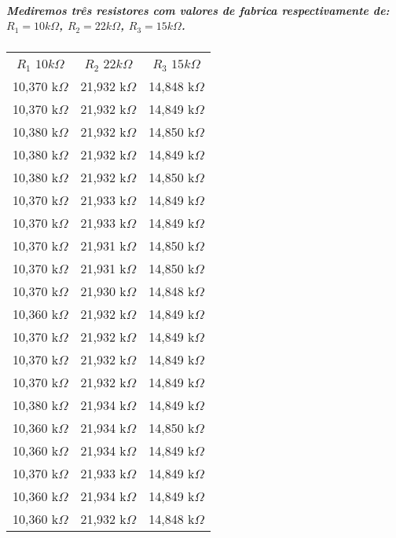 \documentclass[12pt,twoside, a4paper, twocolumn]{article}
\begin{document}
\subparagraph*{Mediremos três resistores com valores de fabrica respectivamente de: $R_1 = 10k\varOmega$, $R_2 = 22k\varOmega$, $R_3 = 15k\varOmega$.}
\begin{center}
    \begin{tabular}{ |c|c|c| }
        \hline
        $R_1$ $10k\varOmega$ & $R_2$ $22k\varOmega$ & $R_3$ $15k\varOmega$ \\
        10,370 k$\varOmega$  & 21,932 k$\varOmega$  & 14,848 k$\varOmega$  \\
        10,370 k$\varOmega$  & 21,932 k$\varOmega$  & 14,849 k$\varOmega$  \\
        10,380 k$\varOmega$  & 21,932 k$\varOmega$  & 14,850 k$\varOmega$  \\
        10,380 k$\varOmega$  & 21,932 k$\varOmega$  & 14,849 k$\varOmega$  \\
        10,380 k$\varOmega$  & 21,932 k$\varOmega$  & 14,850 k$\varOmega$  \\
        10,370 k$\varOmega$  & 21,933 k$\varOmega$  & 14,849 k$\varOmega$  \\
        10,370 k$\varOmega$  & 21,933 k$\varOmega$  & 14,849 k$\varOmega$  \\
        10,370 k$\varOmega$  & 21,931 k$\varOmega$  & 14,850 k$\varOmega$  \\
        10,370 k$\varOmega$  & 21,931 k$\varOmega$  & 14,850 k$\varOmega$  \\
        10,370 k$\varOmega$  & 21,930 k$\varOmega$  & 14,848 k$\varOmega$  \\
        10,360 k$\varOmega$  & 21,932 k$\varOmega$  & 14,849 k$\varOmega$  \\
        10,370 k$\varOmega$  & 21,932 k$\varOmega$  & 14,849 k$\varOmega$  \\
        10,370 k$\varOmega$  & 21,932 k$\varOmega$  & 14,849 k$\varOmega$  \\
        10,370 k$\varOmega$  & 21,932 k$\varOmega$  & 14,849 k$\varOmega$  \\
        10,380 k$\varOmega$  & 21,934 k$\varOmega$  & 14,849 k$\varOmega$  \\
        10,360 k$\varOmega$  & 21,934 k$\varOmega$  & 14,850 k$\varOmega$  \\
        10,360 k$\varOmega$  & 21,934 k$\varOmega$  & 14,849 k$\varOmega$  \\
        10,370 k$\varOmega$  & 21,933 k$\varOmega$  & 14,849 k$\varOmega$  \\
        10,360 k$\varOmega$  & 21,934 k$\varOmega$  & 14,849 k$\varOmega$  \\
        10,360 k$\varOmega$  & 21,932 k$\varOmega$  & 14,848 k$\varOmega$  \\

        \hline
    \end{tabular}
\end{center}
\end{document}
